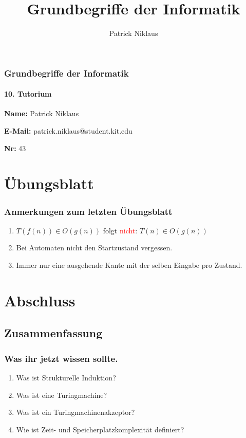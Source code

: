 \documentclass{beamer}
\title{Grundbegriffe der Informatik}
\author{Patrick Niklaus}
\newcommand{\warn}[1]{\textcolor{red}{#1}}
\begin{document}
\begin{frame}
  \frametitle{Grundbegriffe der Informatik}
  \framesubtitle{10. Tutorium}
  \begin{description}
    \item \textbf{Name:} Patrick Niklaus
    \item \textbf{E-Mail:} patrick.niklaus@student.kit.edu
    \item \textbf{Nr:} 43
  \end{description}
\end{frame}

\section{Übungsblatt}
\begin{frame}
  \frametitle{Anmerkungen zum letzten Übungsblatt}
  \begin{enumerate}
    \item $T(f(n)) \in O(g(n))$ folgt \warn{nicht}: $T(n) \in O(g(n))$
    \item Bei Automaten nicht den Startzustand vergessen.
    \item Immer nur eine ausgehende Kante mit der selben Eingabe pro Zustand.
  \end{enumerate}
\end{frame}




\section{Abschluss}
\subsection{Zusammenfassung}
\begin{frame}
  \frametitle{Was ihr jetzt wissen sollte.}
  \begin{enumerate}
    \item Was ist Strukturelle Induktion?
    \item Was ist eine Turingmachine?
    \item Was ist ein Turingmachinenakzeptor?
    \item Wie ist Zeit- und Speicherplatzkomplexität definiert?
  \end{enumerate}
\end{frame}
\end{document}
